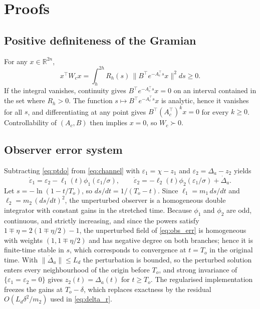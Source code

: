 \section{Proofs}\label{app:proofs}

\subsection{Positive definiteness of the Gramian}
For any $x\in\mathbb R^{2n}$,
\begin{equation}
 x^\top W_cx=\int_h^{2h}R_h(s)\,\|B^\top e^{-A_c^\top s}x\|^2ds\ge0 .
\end{equation}
If the integral vanishes, continuity gives $B^\top e^{-A_c^\top s}x=0$ on an
interval contained in the set where $R_h>0$. The function
$s\mapsto B^\top e^{-A_c^\top s}x$ is analytic, hence it vanishes for all $s$,
and differentiating at any point gives $B^\top(A_c^\top)^kx=0$ for every
$k\ge0$. Controllability of $(A_c,B)$ then implies $x=0$, so $W_c\succ0$.

\subsection{Observer error system}
Subtracting \eqref{eq:ptdo} from \eqref{eq:channel} with
$\varepsilon_1=\chi-z_1$ and $\varepsilon_2=\Delta_a-z_2$ yields
\begin{equation}
 \dot\varepsilon_1=\varepsilon_2-\ell_1(t)\phi_1(\varepsilon_1/\sigma),
 \qquad
 \dot\varepsilon_2=-\ell_2(t)\phi_2(\varepsilon_1/\sigma)+\dot\Delta_a .
 \label{eq:obs_err}
\end{equation}
Let $s=-\ln(1-t/T_o)$, so $ds/dt=1/(T_o-t)$. Since
$\ell_1=m_1\,ds/dt$ and $\ell_2=m_2\,(ds/dt)^2$, the unperturbed observer is a
homogeneous double integrator with constant gains in the stretched time.
Because $\phi_1$ and $\phi_2$ are odd, continuous, and
strictly increasing, and since the powers satisfy
$1\mp\eta=2(1\mp\eta/2)-1$, the unperturbed field of \eqref{eq:obs_err} is
homogeneous with weights $(1,1\mp\eta/2)$ and has negative degree on both
branches; hence it is finite-time stable in $s$, which corresponds to
convergence at $t=T_o$ in the original time. With
$\|\dot\Delta_a\|\le L_d$ the perturbation is bounded, so the perturbed
solution enters every neighbourhood of the origin before $T_o$, and strong
invariance of $\{\varepsilon_1=\varepsilon_2=0\}$ gives
$z_2(t)=\Delta_a(t)$ for $t\ge T_o$. The regularised implementation freezes the
gains at $T_o-\delta$, which replaces exactness by the residual
$O(L_d\delta^2/m_2)$ used in \eqref{eq:delta_r}.

